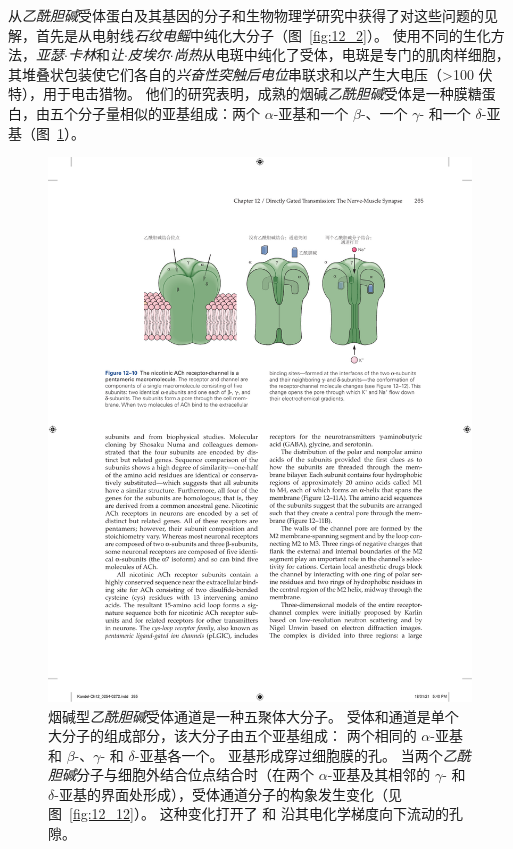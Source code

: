 从\textit{乙酰胆碱}受体蛋白及其基因的分子和生物物理学研究中获得了对这些问题的见解，首先是从电射线\textit{石纹电鳐}中纯化大分子（图~\ref{fig:12_2}）。
使用不同的生化方法，\textit{亚瑟$\cdot$卡林}和\textit{让$\cdot$皮埃尔$\cdot$尚热}从电斑中纯化了受体，电斑是专门的肌肉样细胞，其堆叠状包装使它们各自的\textit{兴奋性突触后电位}串联求和以产生大电压（>100 伏特），用于电击猎物。
他们的研究表明，成熟的烟碱\textit{乙酰胆碱}受体是一种膜糖蛋白，由五个分子量相似的亚基组成：两个 $\alpha$-亚基和一个 $\beta$-、一个 $\gamma$- 和一个 $\delta$-亚基（图~\ref{fig:12_10}）。


\begin{figure}[htbp]
	\centering
	\includegraphics[width=0.95\linewidth]{chap12/fig_12_10}
	\caption{烟碱型\textit{乙酰胆碱}受体通道是一种五聚体大分子。
		受体和通道是单个大分子的组成部分，该大分子由五个亚基组成：
		两个相同的 $\alpha$-亚基和 $\beta$-、$\gamma$- 和 $\delta$-亚基各一个。
		亚基形成穿过细胞膜的孔。
		当两个\textit{乙酰胆碱}分子与细胞外结合位点结合时（在两个 $\alpha$-亚基及其相邻的 $\gamma$- 和 $\delta$-亚基的界面处形成），受体通道分子的构象发生变化（见图~\ref{fig:12_12}）。
		这种变化打开了  和  沿其电化学梯度向下流动的孔隙。}
	\label{fig:12_10}
\end{figure}


